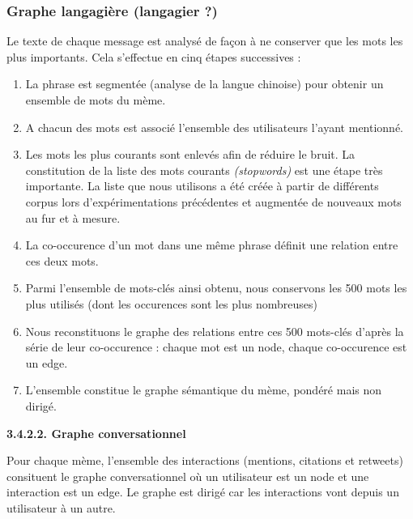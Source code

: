 \subsubsection{Graphe langagi\`ere (langagier ?)}

Le texte de chaque message est analys\'e de fa\c{c}on \`a ne conserver
que les mots les plus importants. Cela s{\textquoteright}effectue en
cinq \'etapes successives : 

\begin{enumerate}
\item La phrase est segment\'ee (analyse de la langue chinoise) pour
obtenir un ensemble de mots du m\`eme.
\item A chacun des mots est associ\'e l{\textquoteright}ensemble des
utilisateurs l{\textquoteright}ayant mentionn\'e.
\item Les mots les plus courants sont enlev\'es afin de r\'eduire le
bruit. La constitution de la liste des mots courants
\textit{(stopwords) }est une \'etape tr\`es importante. La liste que
nous utilisons a \'et\'e cr\'e\'ee \`a partir de diff\'erents corpus
lors d{\textquoteright}exp\'erimentations pr\'ec\'edentes et
augment\'ee de nouveaux mots au fur et \`a mesure.
\item La co-occurence d{\textquoteright}un mot dans une m\^eme phrase
d\'efinit une relation entre ces deux mots.
\item Parmi l{\textquoteright}ensemble de mots-cl\'es ainsi obtenu, nous
conservons les 500 mots les plus utilis\'es (dont les occurences sont
les plus nombreuses) 
\item Nous reconstituons le graphe des relations entre ces 500
mots-cl\'es d{\textquoteright}apr\`es la s\'erie de leur co-occurence :
chaque mot est un node, chaque co-occurence est un edge.
\item L{\textquoteright}ensemble constitue le graphe s\'emantique du
m\`eme, pond\'er\'e mais non dirig\'e.
\end{enumerate}
\textbf{3.4.2.2. Graphe conversationnel}

Pour chaque m\`eme, l{\textquoteright}ensemble des interactions
(mentions, citations et retweets) consituent le graphe conversationnel
o\`u un utilisateur est un node et une interaction est un edge. Le
graphe est dirig\'e car les interactions vont depuis un utilisateur \`a
un autre. 

